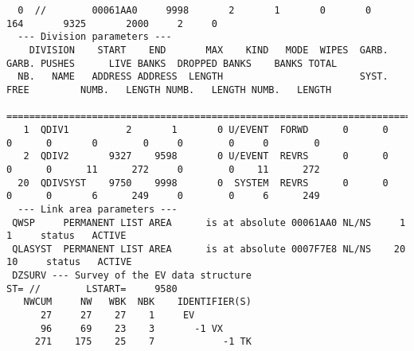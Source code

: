 \begin{Listing}
\begin{verbatim}
  0  //        00061AA0     9998       2       1       0       0        164       9325       2000     2     0
  --- Division parameters ---
    DIVISION    START    END       MAX    KIND   MODE  WIPES  GARB.  GARB. PUSHES      LIVE BANKS  DROPPED BANKS    BANKS TOTAL
  NB.   NAME   ADDRESS ADDRESS  LENGTH                        SYST.   FREE         NUMB.   LENGTH NUMB.   LENGTH NUMB.   LENGTH
 ==============================================================================================================================
   1  QDIV1          2       1       0 U/EVENT  FORWD      0      0      0      0       0        0     0        0     0        0
   2  QDIV2       9327    9598       0 U/EVENT  REVRS      0      0      0      0      11      272     0        0    11      272
  20  QDIVSYST    9750    9998       0  SYSTEM  REVRS      0      0      0      0       6      249     0        0     6      249
  --- Link area parameters ---
 QWSP     PERMANENT LIST AREA      is at absolute 00061AA0 NL/NS     1    1     status   ACTIVE
 QLASYST  PERMANENT LIST AREA      is at absolute 0007F7E8 NL/NS    20   10     status   ACTIVE
 DZSURV --- Survey of the EV data structure                                                         ST= //        LSTART=     9580
   NWCUM     NW   WBK  NBK    IDENTIFIER(S)
      27     27    27    1     EV
      96     69    23    3       -1 VX
     271    175    25    7            -1 TK
 

\end{verbatim}
\end{Listing}
